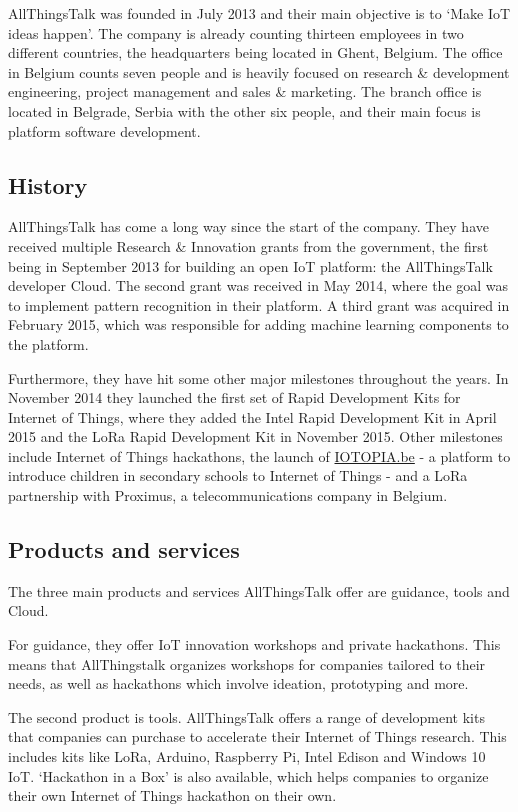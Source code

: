 \documentclass[pdftex,a4paper,12pt,twoside]{report}
\begin{document}
AllThingsTalk was founded in July 2013 and their main objective is to `Make IoT ideas happen'. The company is already counting thirteen employees in two different countries, the headquarters being located in Ghent, Belgium. The office in Belgium counts seven people and is heavily focused on research \& development engineering, project management and sales \& marketing. The branch office is located in Belgrade, Serbia with the other six people, and their main focus is platform software development.

\subsection{History}
\label{subsec:atthistory}
AllThingsTalk has come a long way since the start of the company. They have received multiple Research \& Innovation grants from the government, the first being in September 2013 for building an open IoT platform: the AllThingsTalk developer Cloud. The second grant was received in May 2014, where the goal was to implement pattern recognition in their platform. A third grant was acquired in February 2015, which was responsible for adding machine learning components to the platform.

Furthermore, they have hit some other major milestones throughout the years. In November 2014 they launched the first set of Rapid Development Kits for Internet of Things, where they added the Intel Rapid Development Kit in April 2015 and the LoRa Rapid Development Kit in November 2015. Other milestones include Internet of Things hackathons, the launch of \url{IOTOPIA.be} - a platform to introduce children in secondary schools to Internet of Things - and a LoRa partnership with Proximus, a telecommunications company in Belgium.

\subsection{Products and services}
\label{subsec:attproductsservices}
The three main products and services AllThingsTalk offer are guidance, tools and Cloud. 

For guidance, they offer IoT innovation workshops and private hackathons. This means that AllThingstalk organizes workshops for companies tailored to their needs, as well as hackathons which involve ideation, prototyping and more.

The second product is tools. AllThingsTalk offers a range of development kits that companies can purchase to accelerate their Internet of Things research. This includes kits like LoRa, Arduino, Raspberry Pi, Intel Edison and Windows 10 IoT. `Hackathon in a Box' is also available, which helps companies to organize their own Internet of Things hackathon on their own.
\end{document}
